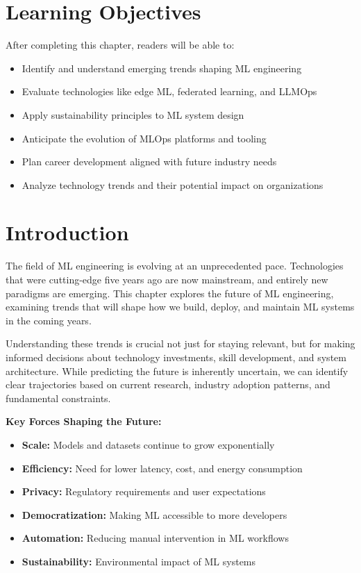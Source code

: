 \section{Learning Objectives}

After completing this chapter, readers will be able to:
\begin{itemize}
    \item Identify and understand emerging trends shaping ML engineering
    \item Evaluate technologies like edge ML, federated learning, and LLMOps
    \item Apply sustainability principles to ML system design
    \item Anticipate the evolution of MLOps platforms and tooling
    \item Plan career development aligned with future industry needs
    \item Analyze technology trends and their potential impact on organizations
\end{itemize}

\section{Introduction}

The field of ML engineering is evolving at an unprecedented pace. Technologies that were cutting-edge five years ago are now mainstream, and entirely new paradigms are emerging. This chapter explores the future of ML engineering, examining trends that will shape how we build, deploy, and maintain ML systems in the coming years.

Understanding these trends is crucial not just for staying relevant, but for making informed decisions about technology investments, skill development, and system architecture. While predicting the future is inherently uncertain, we can identify clear trajectories based on current research, industry adoption patterns, and fundamental constraints.

\textbf{Key Forces Shaping the Future:}

\begin{itemize}
    \item \textbf{Scale:} Models and datasets continue to grow exponentially
    \item \textbf{Efficiency:} Need for lower latency, cost, and energy consumption
    \item \textbf{Privacy:} Regulatory requirements and user expectations
    \item \textbf{Democratization:} Making ML accessible to more developers
    \item \textbf{Automation:} Reducing manual intervention in ML workflows
    \item \textbf{Sustainability:} Environmental impact of ML systems
\end{itemize}

